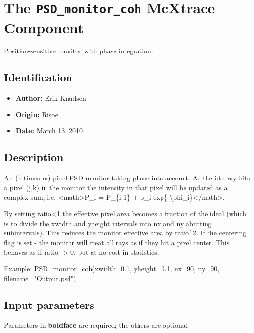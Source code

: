 \section{The \texttt{PSD\_monitor\_coh} McXtrace Component}
Position-sensitive monitor with phase integration.

\subsection*{Identification}
\begin{itemize}
  \item \textbf{Author:} Erik Knudsen
  \item \textbf{Origin:} Risoe
  \item \textbf{Date:} March 13, 2010
\end{itemize}

\subsection*{Description}
An (n times m) pixel PSD monitor taking phase into account. As the i:th ray hits a pixel (j,k) in the monitor the intensity in that pixel will be updated as a complex sum, i.e. \textless{}math\textgreater{}P\_i = P\_\{i-1\} + p\_i exp\{-\textbackslash{}phi\_i\}\textless{}/math\textgreater{}.

By setting ratio\textless{}1 the effective pixel area becomes a fraction of the ideal (which is to divide the xwidth and yheight intervals into nx and ny abutting subintervals). This reduces the monitor effective area by ratio\textasciicircum{}2. If the centering flag is set - the monitor will treat all rays as if they hit a pixel center. This behaves as if ratio -\textgreater{} 0, but at no cost in statistics.

Example: PSD\_monitor\_coh(xwidth=0.1, yheight=0.1, nx=90, ny=90, filename="Output.psd")

\subsection*{Input parameters}
Parameters in \textbf{boldface} are required; the others are optional.


